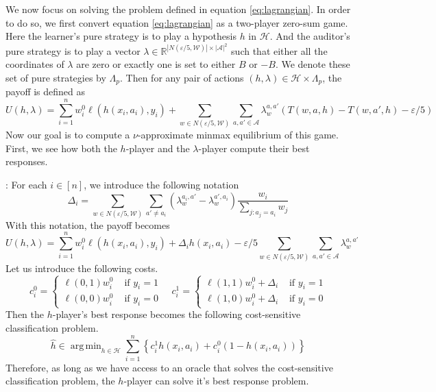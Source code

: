 \documentclass[11pt]{article}
\renewcommand{\hat}{\widehat}
\newcommand{\bbR}{\mathbb{R}}
\DeclareMathOperator*{\argmin}{arg\,min}
\newcommand{\WW}{\mathcal{W}}
\newcommand{\abs}[1]{\left|#1\right|}
\newcommand{\Ac}{\mathcal{A}}
\newcommand{\HH}{\mathcal{H}}
\newcommand{\eps}{\varepsilon}
\begin{document}
We now focus on solving the problem defined in equation \ref{eq:lagrangian}. In order to do so, we first convert equation \ref{eq:lagrangian} as a two-player zero-sum game. Here the learner's pure strategy is to play a hypothesis $h$ in $\HH$. And the auditor's pure strategy is to play a vector $\lambda \in \bbR^{\abs{N(\eps/5,\WW)} \times \abs{\Ac}^2}$ such that either all the coordinates of $\lambda$ are zero or exactly one is set to either $B$ or $-B$. We denote these set of pure strategies by $\Lambda_p$. Then for any pair of actions $(h,\lambda) \in \HH \times \Lambda_p$, the payoff is defined as
\[U(h,\lambda) = \sum_{i=1}^n w^0_i \ell(h(x_i,a_i),y_i) + \sum_{w \in N(\eps/5,\WW)} \sum_{a,a' \in \Ac} \lambda_w^{a,a'} ( T(w,a,h) - T(w,a',h) - \eps / 5) \]
Now our goal is to compute a $\nu$-approximate minmax equilibrium of this game. First, we see how both the $h$-player and the $\lambda$-player compute their best responses. 

: For each $i \in [n]$, we introduce the following notation
$$\Delta_i = \sum_{w \in N(\eps/5,\WW)} \sum_{a' \neq a_i} \left(\lambda^{a_i,a'}_w - \lambda^{a',a_i}_w \right) \frac{w_i}{\sum_{j:a_j = a_i}w_j}$$
With this notation, the payoff becomes
$$U(h,\lambda) = \sum_{i=1}^n w^0_i \ell(h(x_i,a_i),y_i) + \Delta_i h(x_i,a_i) - \eps/5 \sum_{w \in N(\eps/5,\WW)} \sum_{a,a' \in \Ac} \lambda_w^{a,a'}$$
Let us introduce the following costs.
\begin{equation}
c^0_i = \left\{ \begin{array}{cc}
\ell(0,1)w^0_i & \text{ if } y_i = 1\\
\ell(0,0)w^0_i & \text{ if } y_i = 0
\end{array}\right. \quad 
c^1_i = \left\{ \begin{array}{cc}
\ell(1,1)w^0_i + \Delta_i & \text{ if } y_i = 1\\
\ell(1,0)w^0_i + \Delta_i & \text{ if } y_i = 0
\end{array}\right.
\end{equation}
Then the $h$-player's best response becomes the following cost-sensitive classification problem.
\begin{equation}
\hat{h} \in \argmin_{h \in \HH} \sum_{i=1}^n \left\{c^1_i h(x_i,a_i) + c^0_i (1 - h(x_i,a_i)) \right\}
\end{equation}
Therefore, as long as we have access to an oracle that solves the cost-sensitive classification problem, the $h$-player can solve it's best response problem.
\end{document}
